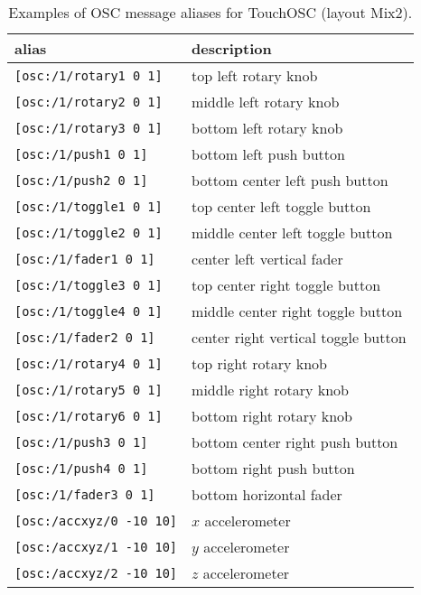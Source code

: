 \begin{table}[htp]
\begin{center}
\begin{tabular}{|l|l|}
\hline
\bf{alias} 	& \bf{description}	\\
\hline
\lstinline'[osc:/1/rotary1 0 1]' & top left rotary knob\\
\lstinline'[osc:/1/rotary2 0 1]' & middle left rotary knob\\
\lstinline'[osc:/1/rotary3 0 1]' & bottom left rotary knob\\
\lstinline'[osc:/1/push1 0 1]' & bottom left push button\\
\lstinline'[osc:/1/push2 0 1]' & bottom center left push button\\
\hline
\lstinline'[osc:/1/toggle1 0 1]' & top center left toggle button\\
\lstinline'[osc:/1/toggle2 0 1]' & middle center left toggle button\\
\lstinline'[osc:/1/fader1 0 1]' & center left vertical fader\\
\hline
\lstinline'[osc:/1/toggle3 0 1]' & top center right toggle button\\
\lstinline'[osc:/1/toggle4 0 1]' & middle center right toggle button\\
\lstinline'[osc:/1/fader2 0 1]' & center right vertical toggle button\\
\hline
\lstinline'[osc:/1/rotary4 0 1]' & top right rotary knob\\
\lstinline'[osc:/1/rotary5 0 1]' & middle right rotary knob\\
\lstinline'[osc:/1/rotary6 0 1]' & bottom right rotary knob\\
\lstinline'[osc:/1/push3 0 1]' & bottom center right push button\\
\lstinline'[osc:/1/push4 0 1]' & bottom right push button\\
\hline
\lstinline'[osc:/1/fader3 0 1]' & bottom horizontal fader\\
\hline
\lstinline'[osc:/accxyz/0 -10 10]' &  $x$ accelerometer\\
\lstinline'[osc:/accxyz/1 -10 10]' &  $y$ accelerometer\\
\lstinline'[osc:/accxyz/2 -10 10]' &  $z$ accelerometer\\
\hline
\end{tabular}
\end{center}
\caption{Examples of OSC message aliases for TouchOSC (layout Mix2).}
\label{tab:oscalias}
\end{table}

